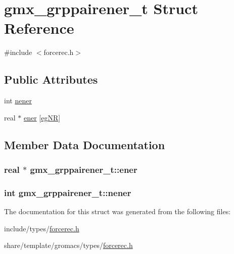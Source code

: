 \hypertarget{structgmx__grppairener__t}{\section{gmx\-\_\-grppairener\-\_\-t \-Struct \-Reference}
\label{structgmx__grppairener__t}
}


{\ttfamily \#include $<$forcerec.\-h$>$}

\subsection*{\-Public \-Attributes}
\begin{DoxyCompactItemize}
\item 
int \hyperlink{structgmx__grppairener__t_a932b8d257315ad7f7ef50463a0e187b7}{nener}
\item 
real $\ast$ \hyperlink{structgmx__grppairener__t_a188d3fe8f384fb35b09bb458a6f6dddc}{ener} \mbox{[}\hyperlink{share_2template_2gromacs_2types_2forcerec_8h_a85c1893697b201be6423e3534d866636af12ca4024021fc1f636e5d6b58a93fe5}{eg\-N\-R}\mbox{]}
\end{DoxyCompactItemize}


\subsection{\-Member \-Data \-Documentation}
\hypertarget{structgmx__grppairener__t_a188d3fe8f384fb35b09bb458a6f6dddc}{
\subsubsection[{ener}]{\setlength{\rightskip}{0pt plus 5cm}real $\ast$ {\bf gmx\-\_\-grppairener\-\_\-t\-::ener}}}\label{structgmx__grppairener__t_a188d3fe8f384fb35b09bb458a6f6dddc}
\hypertarget{structgmx__grppairener__t_a932b8d257315ad7f7ef50463a0e187b7}{
\subsubsection[{nener}]{\setlength{\rightskip}{0pt plus 5cm}int {\bf gmx\-\_\-grppairener\-\_\-t\-::nener}}}\label{structgmx__grppairener__t_a932b8d257315ad7f7ef50463a0e187b7}


\-The documentation for this struct was generated from the following files\-:\begin{DoxyCompactItemize}
\item 
include/types/\hyperlink{include_2types_2forcerec_8h}{forcerec.\-h}\item 
share/template/gromacs/types/\hyperlink{share_2template_2gromacs_2types_2forcerec_8h}{forcerec.\-h}\end{DoxyCompactItemize}
